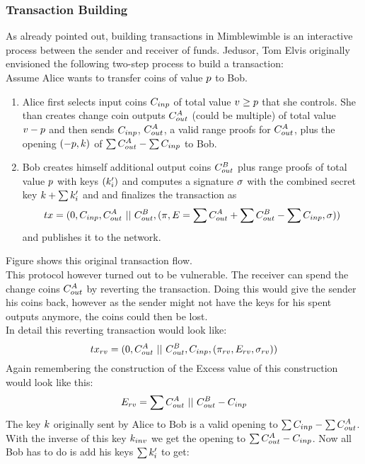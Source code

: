 \subsubsection{Transaction Building}
As already pointed out, building transactions in Mimblewimble is an interactive process between the sender and receiver of funds. Jedusor, Tom Elvis originally envisioned the following two-step process
to build a transaction:~\cite{jedusor2016mimblewimble}\\
Assume Alice wants to transfer coins of value $p$ to Bob.
\begin{enumerate}
    \item Alice first selects input coins $C_{inp}$ of total value $v \geq p$ that she controls. She than creates change coin outputs $C_{out}^{A}$ (could be multiple) of total value $v - p$ and then
    sends $C_{inp}$, $C_{out}^{A}$, a valid range proofs for $C_{out}^{A}$, plus the opening $(-p, k)$ of $\sum{C_{out}^{A}} - \sum{C_{inp}}$ to Bob.
    \item Bob creates himself additional output coins $C_{out}^B$ plus range proofs of total value $p$ with keys $(k'_i)$ and computes a signature $\sigma$ with the combined secret key $k + \sum{k'_i}$ and
    and finalizes the transaction as
    \[ tx = (0, C_{inp}, C_{out}^A ~||~ C_{out}^B, (\pi, E = \sum{C_{out}^A} + \sum{C_{out}^B} - \sum{C_{inp}}, \sigma)) \]
    and publishes it to the network.
\end{enumerate}
Figure shows this original transaction flow.\\
This protocol however turned out to be vulnerable. The receiver can spend the change coins $C_{out}^A$ by reverting the transaction. Doing this would give the sender his coins back, however as the sender
might not have the keys for his spent outputs anymore, the coins could then be lost.\\
In detail this reverting transaction would look like:
\[ tx_{rv} = (0, C_{out}^A ~||~ C_{out}^B, C_{inp}, (\pi_{rv}, E_{rv}, \sigma_{rv}) ) \]
Again remembering the construction of the Excess value of this construction would look like this:
\[ E_{rv} = \sum{C_{out}^A ~||~ C_{out}^B - C_{inp}} \]
The key $k$ originally sent by Alice to Bob is a valid opening to $\sum{C_{inp}} - \sum{C_{out}^A}$. With the inverse of this key $k_{inv}$ we get the opening to $\sum{C_{out}^A - C_{inp}}$.
Now all Bob has to do is add his keys $\sum{k'_i}$ to get:
